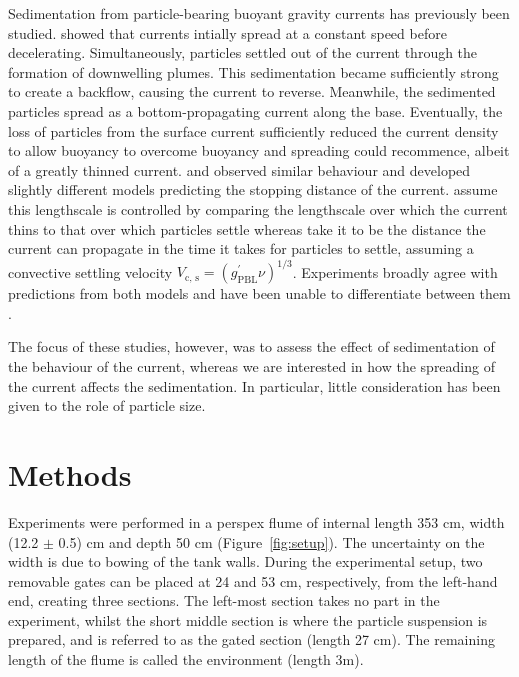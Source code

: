 \documentclass[authoryear,preprint,review,12pt]{elsarticle}
\begin{document}
Sedimentation from particle-bearing buoyant gravity currents has previously been studied.\citet{Maxworthy99} showed that currents intially spread at a constant speed before decelerating. Simultaneously, particles settled out of the current through the formation of downwelling plumes. This sedimentation became sufficiently strong to create a backflow, causing the current to reverse. Meanwhile, the sedimented particles spread as a bottom-propagating current along the base. Eventually, the loss of particles from the surface current sufficiently reduced the current density to allow buoyancy to overcome buoyancy and spreading could recommence, albeit of a greatly thinned current. \citet{Sutherland18} and \citet{Jazi19} observed similar behaviour and developed slightly different models predicting the stopping distance of the current. \citet{Sutherland18} assume this lengthscale is controlled by comparing the lengthscale over which the current thins to that over which particles settle whereas \citet{Jazi19} take it to be the distance the current can propagate in the time it takes for particles to settle, assuming a convective settling velocity $V_{\text{c, s}} = (g^{\prime}_{\text{PBL}} \nu)^{1/3}$. Experiments broadly agree with predictions from both models and have been unable to differentiate between them \citep{Jazi19}.

The focus of these studies, however, was to assess the effect of sedimentation of the behaviour of the current, whereas we are interested in how the spreading of the current affects the sedimentation. In particular, little consideration has been given to the role of particle size. 

\section{Methods}
\label{sec:method}

Experiments were performed in a perspex flume of internal length 353 cm, width (12.2 $\pm$ 0.5) cm and depth 50 cm (Figure~\ref{fig:setup}). The uncertainty on the width is due to bowing of the tank walls. During the experimental setup, two removable gates can be placed at 24 and 53 cm, respectively, from the left-hand end, creating three sections. The left-most section takes no part in the experiment, whilst the short middle section is where the particle suspension is prepared, and is referred to as the gated section (length 27 cm). The remaining length of the flume is called the environment (length 3m).
\end{document}
